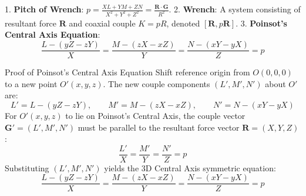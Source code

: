 \begin{defbox}
1. \textbf{Pitch of Wrench}: $p = \frac{XL + YM + ZN}{X^2 + Y^2 + Z^2} = \frac{\mathbf{R} \cdot \mathbf{G}}{R^2}$.
2. \textbf{Wrench}: A system consisting of resultant force $\mathbf{R}$ and coaxial couple $K = p R$, denoted $[\mathbf{R}, p\mathbf{R}]$.
3. \textbf{Poinsot's Central Axis Equation}:
\begin{equation}
\frac{L - (yZ - zY)}{X} = \frac{M - (zX - xZ)}{Y} = \frac{N - (xY - yX)}{Z} = p
\end{equation}

\begin{center}
\end{center}
\end{defbox}

\begin{proofbox}{Proof of Poinsot's Central Axis Equation}
Shift reference origin from $O(0,0,0)$ to a new point $O'(x, y, z)$.
The new couple components $(L', M', N')$ about $O'$ are:
\[
L' = L - (yZ - zY), \qquad M' = M - (zX - xZ), \qquad N' = N - (xY - yX)
\]
For $O'(x, y, z)$ to lie on Poinsot's Central Axis, the couple vector $\mathbf{G}' = (L', M', N')$ must be parallel to the resultant force vector $\mathbf{R} = (X, Y, Z)$:
\[
\frac{L'}{X} = \frac{M'}{Y} = \frac{N'}{Z} = p
\]
Substituting $(L', M', N')$ yields the 3D Central Axis symmetric equation:
\begin{equation}
\frac{L - (yZ - zY)}{X} = \frac{M - (zX - xZ)}{Y} = \frac{N - (xY - yX)}{Z} = p
\end{equation}
\end{proofbox}

